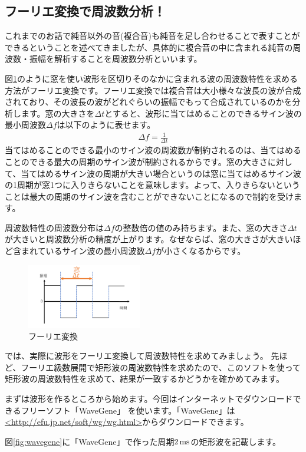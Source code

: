 \documentclass[11pt,b5paper,papersize,dvipdfmx]{jsbook}
\begin{document}
%
\subsection{フーリエ変換で周波数分析！}
これまでのお話で純音以外の音(複合音)も純音を足し合わせることで表すことができるということを述べてきましたが、具体的に複合音の中に含まれる純音の周波数・振幅を解析することを周波数分析といいます。\par
図\ref{fig:furie}のように窓を使い波形を区切りそのなかに含まれる波の周波数特性を求める方法がフーリエ変換です。フーリエ変換では複合音は大小様々な波長の波が合成されており、その波長の波がどれぐらいの振幅でもって合成されているのかを分析します。窓の大きさを$\Delta t$とすると、波形に当てはめることのできるサイン波の最小周波数$\Delta f$は以下のように表せます。
\begin{align}
  \Delta f=\frac{1}{\Delta t}
\end{align}
当てはめることのできる最小のサイン波の周波数が制約されるのは、当てはめることのできる最大の周期のサイン波が制約されるからです。窓の大きさに対して、当てはめるサイン波の周期が大きい場合というのは窓に当てはめるサイン波の1周期が窓1つに入りきらないことを意味します。よって、入りきらないということは最大の周期のサイン波を含むことができないことになるので制約を受けます。\par
周波数特性の周波数分布は$\Delta f$の整数倍の値のみ持ちます。また、窓の大きさ$\Delta t$が大きいと周波数分析の精度が上がります。なぜならば、窓の大きさが大きいほど含まれているサイン波の最小周波数$\Delta f$が小さくなるからです。
\begin{figure}[H]
  \centering
  \includegraphics[width=5cm]{nsmr/img/slide11.png}
  \caption{フーリエ変換}
  \label{fig:furie}
\end{figure}
では、実際に波形をフーリエ変換して周波数特性を求めてみましょう。
先ほど、フーリエ級数展開で矩形波の周波数特性を求めたので、このソフトを使って矩形波の周波数特性を求めて、結果が一致するかどうかを確かめてみます。\par
まずは波形を作るところから始めます。今回はインターネットでダウンロードできるフリーソフト「WaveGene」	を使います。「WaveGene」は\url{<http://efu.jp.net/soft/wg/wg.html>}からダウンロードできます。\par
図\ref{fig:wavegene}に「WaveGene」で作った周期$2\tani{ms}$の矩形波を記載します。
\end{document}
